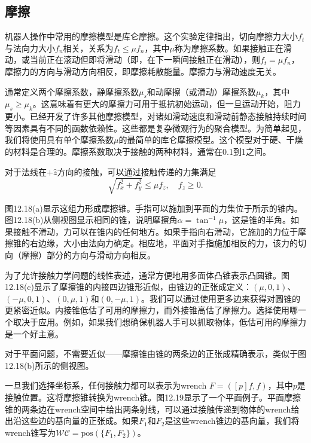 \documentclass[12pt,a4paper]{article}
\begin{document}
\subsection{摩擦}
\label{subsec:friction}

机器人操作中常用的摩擦模型是库仑摩擦。这个实验定律指出，切向摩擦力大小$f_t$与法向力大小$f_n$相关，关系为$f_t \leq \mu f_n$，其中$\mu$称为摩擦系数。如果接触正在滑动，或当前正在滚动但即将滑动（即，在下一瞬间接触正在滑动），则$f_t = \mu f_n$，摩擦力的方向与滑动方向相反，即摩擦耗散能量。摩擦力与滑动速度无关。

通常定义两个摩擦系数，静摩擦系数$\mu_s$和动摩擦（或滑动）摩擦系数$\mu_k$，其中$\mu_s \geq \mu_k$。这意味着有更大的摩擦力可用于抵抗初始运动，但一旦运动开始，阻力更小。已经开发了许多其他摩擦模型，对诸如滑动速度和滑动前静态接触持续时间等因素具有不同的函数依赖性。这些都是复杂微观行为的聚合模型。为简单起见，我们将使用具有单个摩擦系数$\mu$的最简单的库仑摩擦模型。这个模型对于硬、干燥的材料是合理的。摩擦系数取决于接触的两种材料，通常在0.1到1之间。

对于法线在$+\hat{z}$方向的接触，可以通过接触传递的力集满足
\begin{equation}
\sqrt{f_x^2 + f_y^2} \leq \mu f_z, \quad f_z \geq 0.
\label{eq:12.16}
\end{equation}

图12.18(a)显示这组力形成摩擦锥。手指可以施加到平面的力集位于所示的锥内。图12.18(b)从侧视图显示相同的锥，说明摩擦角$\alpha = \tan^{-1} \mu$，这是锥的半角。如果接触不滑动，力可以在锥内的任何地方。如果手指向右滑动，它施加的力位于摩擦锥的右边缘，大小由法向力确定。相应地，平面对手指施加相反的力，该力的切向（摩擦）部分的方向与滑动方向相反。

为了允许接触力学问题的线性表述，通常方便地用多面体凸锥表示凸圆锥。图12.18(c)显示了摩擦锥的内接四边锥形近似，由锥边的正张成定义：$(\mu, 0, 1)$、$(-\mu, 0, 1)$、$(0, \mu, 1)$和$(0, -\mu, 1)$。我们可以通过使用更多边来获得对圆锥的更紧密近似。内接锥低估了可用的摩擦力，而外接锥高估了摩擦力。选择使用哪一个取决于应用。例如，如果我们想确保机器人手可以抓取物体，低估可用的摩擦力是一个好主意。

对于平面问题，不需要近似——摩擦锥由锥的两条边的正张成精确表示，类似于图12.18(b)所示的侧视图。

一旦我们选择坐标系，任何接触力都可以表示为wrench $F = ([p]f, f)$，其中$p$是接触位置。这将摩擦锥转换为wrench锥。图12.19显示了一个平面例子。平面摩擦锥的两条边在wrench空间中给出两条射线，可以通过接触传递到物体的wrench给出沿这些边的基向量的正张成。如果$F_1$和$F_2$是这些wrench锥边的基向量，我们将wrench锥写为$\mathcal{WC} = \text{pos}(\{F_1, F_2\})$。
\end{document}
